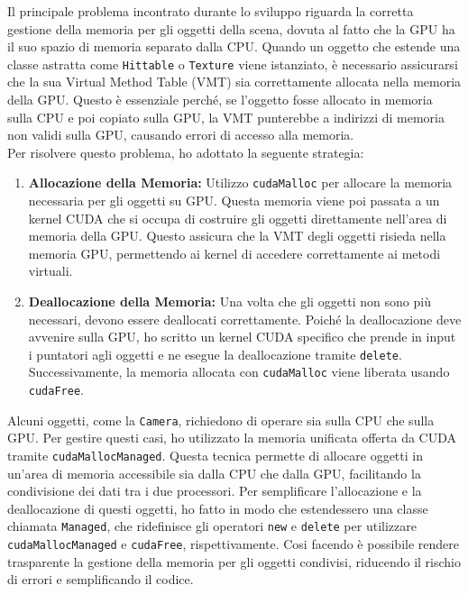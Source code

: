 \documentclass{article}
\begin{document}
Il principale problema incontrato durante lo sviluppo riguarda la corretta gestione della memoria per gli oggetti della scena, dovuta al fatto che la GPU ha il suo spazio di memoria separato dalla CPU. Quando un oggetto che estende una classe astratta come \texttt{Hittable} o \texttt{Texture} viene istanziato, è necessario assicurarsi che la sua Virtual Method Table (VMT) sia correttamente allocata nella memoria della GPU. Questo è essenziale perché, se l'oggetto fosse allocato in memoria sulla CPU e poi copiato sulla GPU, la VMT punterebbe a indirizzi di memoria non validi sulla GPU, causando errori di accesso alla memoria.\\

Per risolvere questo problema, ho adottato la seguente strategia:

\begin{enumerate}
    \item \textbf{Allocazione della Memoria:} Utilizzo \texttt{cudaMalloc} per allocare la memoria necessaria per gli oggetti su GPU. Questa memoria viene poi passata a un kernel CUDA che si occupa di costruire gli oggetti direttamente nell'area di memoria della GPU. Questo assicura che la VMT degli oggetti risieda nella memoria GPU, permettendo ai kernel di accedere correttamente ai metodi virtuali.
    
    \item \textbf{Deallocazione della Memoria:} Una volta che gli oggetti non sono più necessari, devono essere deallocati correttamente. Poiché la deallocazione deve avvenire sulla GPU, ho scritto un kernel CUDA specifico che prende in input i puntatori agli oggetti e ne esegue la deallocazione tramite \texttt{delete}. Successivamente, la memoria allocata con \texttt{cudaMalloc} viene liberata usando \texttt{cudaFree}.
\end{enumerate}

Alcuni oggetti, come la \texttt{Camera}, richiedono di operare sia sulla CPU che sulla GPU. Per gestire questi casi, ho utilizzato la memoria unificata offerta da CUDA tramite \texttt{cudaMallocManaged}. Questa tecnica permette di allocare oggetti in un'area di memoria accessibile sia dalla CPU che dalla GPU, facilitando la condivisione dei dati tra i due processori. Per semplificare l'allocazione e la deallocazione di questi oggetti, ho fatto in modo che estendessero una classe chiamata \texttt{Managed}, che ridefinisce gli operatori \texttt{new} e \texttt{delete} per utilizzare \texttt{cudaMallocManaged} e \texttt{cudaFree}, rispettivamente. Cosi facendo è possibile rendere trasparente la gestione della memoria per gli oggetti condivisi, riducendo il rischio di errori e semplificando il codice.
\end{document}
